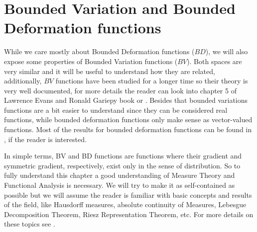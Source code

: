 \section{Bounded Variation and Bounded Deformation functions}
\label{sec:BD}

While we care mostly about Bounded Deformation functions ($BD$), we will also expose some properties of Bounded Variation functions ($BV$). Both spaces are very similar and it will be useful to understand how they are related, additionally, $BV$ functions have been studied for a longer time so their theory is very well documented, for more details the reader can look into chapter 5 of Lawrence Evans and Ronald Gariepy book \cite{evansGa} or \cite{SBV1, SBV2, SBV3}. Besides that bounded variations functions are a bit easier to understand since they can be considered real functions, while bounded deformation functions only make sense as vector-valued functions. Most of the results for bounded deformation functions can be found in \cite{Ambrosio1997, RogerPaper, RogerBook, SBD1, SBD2}, if the reader is interested.

In simple terms, BV and BD functions are functions where their gradient and symmetric gradient, respectively, exist only in the sense of distribution. So to fully understand this chapter a good understanding of Measure Theory and Functional Analysis is necessary. We will try to make it as self-contained as possible but we will assume the reader is familiar with basic concepts and results of the field, like Hausdorff measures, absolute continuity of Measures, Lebesgue Decomposition Theorem, Riesz Representation Theorem, etc. For more details on these topics see \cite{evansGa}.

